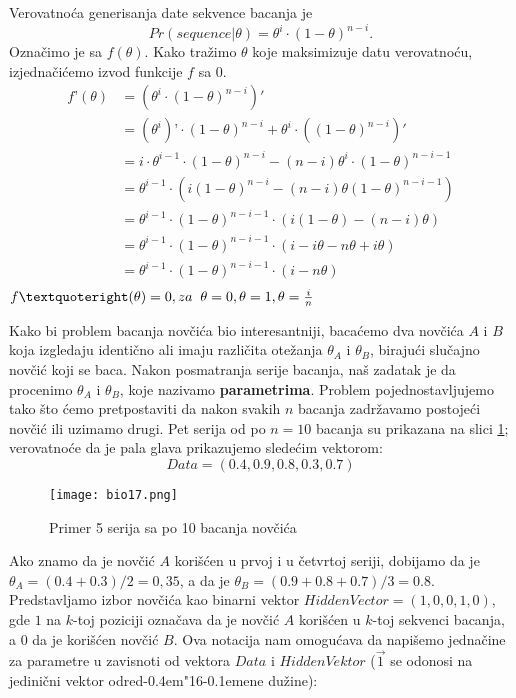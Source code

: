 \documentclass[a4paper]{book}
\def \dj {d\kern-0.4em\char"16\kern-0.1em}
\begin{document}
Verovatnoća generisanja date sekvence bacanja je 
$$Pr(sequence|{\theta}) = {\theta}^i \cdot (1-{\theta})^{n-i}.$$
Označimo je sa $f(\theta)$. Kako tražimo $\theta$ koje maksimizuje datu verovatnoću, izjednačićemo izvod funkcije $f$ sa 0.
\begin{equation}
\begin{split}
f’(\theta) & = (\theta^i \cdot (1-\theta)^{n-i})'\\
	  & = (\theta^i)’ \cdot (1-\theta)^{n-i} + \theta^i \cdot ((1-\theta)^{n-i})'\\
	  & = i \cdot \theta^{i-1} \cdot (1-\theta)^{n-i} - (n-i)\theta^i \cdot (1-\theta)^{n-i-1}\\
	  & = \theta^{i-1} \cdot (i(1-\theta)^{n-i} - (n-i)\theta(1-\theta)^{n-i-1})\\
	  & = \theta^{i-1} \cdot (1-\theta)^{n-i-1} \cdot (i(1-\theta)-(n-i)\theta)\\
	  & = \theta^{i-1} \cdot (1-\theta)^{n-i-1} \cdot (i-i\theta-n\theta+i\theta)\\
	  & = \theta^{i-1} \cdot (1-\theta)^{n-i-1} \cdot (i-n\theta)\\
\end{split}
\end{equation}
$f’(\theta)=0, za \hspace{0.2cm} \theta=0, \theta=1, \theta=\frac{i}{n}$ 

Kako bi problem bacanja novčića bio interesantniji, bacaćemo dva novčića $A$ i $B$ koja izgledaju identično ali imaju različita otežanja $\theta_A$ i $\theta_B$, birajući slučajno novčić koji se baca. Nakon posmatranja serije bacanja, naš zadatak je da procenimo $\theta_A$ i $\theta_B$, koje nazivamo \textbf{parametrima}. Problem pojednostavljujemo tako što ćemo pretpostaviti da nakon svakih $n$ bacanja zadržavamo postojeći novčić ili uzimamo drugi. Pet serija od po $n = 10$ bacanja su prikazana na slici \ref{slika 17}; verovatnoće da je pala glava prikazujemo sledećim vektorom:
$$
Data = (0.4, 0.9, 0.8, 0.3, 0.7)
$$
\begin{figure}[h!]
    \centering
    \texttt{[image: bio17.png]}
    \caption{Primer 5 serija sa po 10 bacanja novčića}
    \label{slika 17}
\end{figure}

Ako znamo da je novčić $A$ korišćen u prvoj i u četvrtoj seriji, dobijamo da je $\theta_A=(0.4+0.3)/2=0,35$, a da je $\theta_B=(0.9+0.8+0.7)/3=0.8$. Predstavljamo izbor novčića kao binarni vektor $HiddenVector=(1,0,0,1,0)$, gde $1$ na $k$-toj poziciji označava da je novčić $A$ korišćen u $k$-toj sekvenci bacanja, a $0$ da je korišćen novčić $B$. Ova notacija nam omogućava da napišemo jednačine za parametre u zavisnoti od vektora $Data$ i $HiddenVektor$ ($\overrightarrow{1}$ se odonosi na jedinični vektor odre\dj ene dužine):
\end{document}
